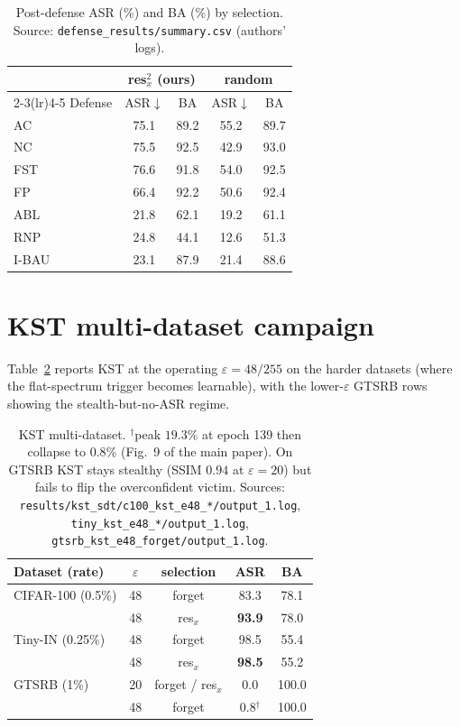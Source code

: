 \documentclass[10pt,twocolumn,letterpaper]{article}
\begin{document}
\begin{table}[h]
\centering
\small
\setlength{\tabcolsep}{4pt}
\begin{tabular}{l c c c c}
\toprule
& \multicolumn{2}{c}{res$_x^2$ (ours)} & \multicolumn{2}{c}{random} \\
\cmidrule(lr){2-3}\cmidrule(lr){4-5}
Defense & ASR$\downarrow$ & BA & ASR$\downarrow$ & BA \\
\midrule
AC~\cite{chen2018activation}    & 75.1 & 89.2 & 55.2 & 89.7 \\
NC~\cite{wang2019neuralcleanse} & 75.5 & 92.5 & 42.9 & 93.0 \\
FST                             & 76.6 & 91.8 & 54.0 & 92.5 \\
FP~\cite{liu2018finepruning}    & 66.4 & 92.2 & 50.6 & 92.4 \\
ABL~\cite{li2021abl}            & 21.8 & 62.1 & 19.2 & 61.1 \\
RNP~\cite{li2023rnp}           & 24.8 & 44.1 & 12.6 & 51.3 \\
I-BAU~\cite{zeng2022ibau}       & 23.1 & 87.9 & 21.4 & 88.6 \\
\bottomrule
\end{tabular}
\caption{Post-defense ASR (\%) and BA (\%) by selection. Source:
\texttt{defense\_results/summary.csv} (authors' logs).}
\label{tab:defense-detail}
\end{table}

\section{KST multi-dataset campaign}
\label{sec:kst-campaign}
Table~\ref{tab:kst-campaign} reports KST at the operating $\varepsilon\!=\!48/255$
on the harder datasets (where the flat-spectrum trigger becomes learnable),
with the lower-$\varepsilon$ GTSRB rows showing the stealth-but-no-ASR regime.

\begin{table}[h]
\centering
\small
\begin{tabular}{l c c c c}
\toprule
Dataset (rate) & $\varepsilon$ & selection & ASR & BA \\
\midrule
CIFAR-100 (0.5\%) & 48 & forget    & 83.3 & 78.1 \\
                  & 48 & res$_x$   & \textbf{93.9} & 78.0 \\
Tiny-IN (0.25\%)  & 48 & forget    & 98.5 & 55.4 \\
                  & 48 & res$_x$   & \textbf{98.5} & 55.2 \\
GTSRB (1\%)       & 20 & forget / res$_x$ & 0.0 & 100.0 \\
                  & 48 & forget    & 0.8$^\dagger$ & 100.0 \\
\bottomrule
\end{tabular}
\caption{KST multi-dataset. $^\dagger$peak $19.3\%$ at epoch 139 then collapse
to $0.8\%$ (Fig.~9 of the main paper). On GTSRB KST stays stealthy (SSIM $0.94$
at $\varepsilon\!=\!20$) but fails to flip the overconfident victim. Sources:
\texttt{results/kst\_sdt/c100\_kst\_e48\_*/output\_1.log},
\texttt{tiny\_kst\_e48\_*/output\_1.log},
\texttt{gtsrb\_kst\_e48\_forget/output\_1.log}.}
\label{tab:kst-campaign}
\end{table}
\end{document}
